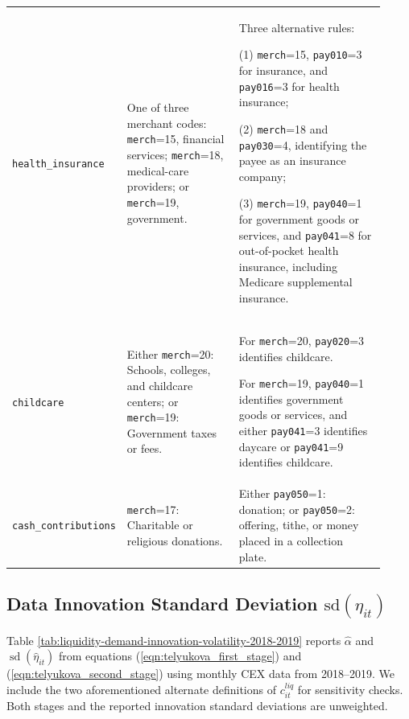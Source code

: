 \documentclass[11pt]{article}
\newcommand{\code}[1]{\nolinkurl{#1}}
\begin{document}
\begin{landscape}
\begin{longtable}{
			>{\RaggedRight\arraybackslash}p{0.20\linewidth}
			>{\RaggedRight\arraybackslash}p{0.31\linewidth}
			>{\RaggedRight\arraybackslash}p{0.41\linewidth}
		}
		\code{health_insurance} &
		One of three merchant codes:
		\code{merch}=15, financial services;
		\code{merch}=18, medical-care providers; or
		\code{merch}=19, government. &
		Three alternative rules:
		
		(1) \code{merch}=15, \code{pay010}=3 for insurance, and
		\code{pay016}=3 for health insurance;
		
		(2) \code{merch}=18 and \code{pay030}=4, identifying the payee as an
		insurance company;
		
		(3) \code{merch}=19, \code{pay040}=1 for government goods or services,
		and \code{pay041}=8 for out-of-pocket health insurance, including
		Medicare supplemental insurance. \\
		
		\code{childcare} &
		Either \code{merch}=20: Schools, colleges, and childcare centers; or
		\code{merch}=19: Government taxes or fees. &
		For \code{merch}=20, \code{pay020}=3 identifies childcare.
		
		For \code{merch}=19, \code{pay040}=1 identifies government goods or
		services, and either \code{pay041}=3 identifies daycare or
		\code{pay041}=9 identifies childcare. \\
		
		\code{cash_contributions} &
		\code{merch}=17: Charitable or religious donations. &
		Either \code{pay050}=1: donation; or
		\code{pay050}=2: offering, tithe, or money placed in a collection plate. \\
		
	\end{longtable}
\end{landscape}

\subsection{Data Innovation Standard Deviation $\text{sd}(\eta_{it})$}

Table \ref{tab:liquidity-demand-innovation-volatility-2018-2019} reports $\widehat{\alpha}$ and $\operatorname{sd}(\widehat{\eta}_{it})$ from equations (\ref{eqn:telyukova_first_stage}) and (\ref{eqn:telyukova_second_stage}) using monthly CEX data from 2018--2019. We include the two aforementioned alternate definitions of $c^{liq}_{it}$ for sensitivity checks. Both stages and the reported innovation standard deviations are unweighted. 
\end{document}
